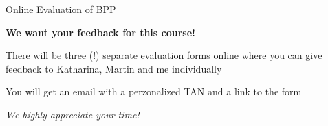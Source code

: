\begin{frame}{Online Evaluation of BPP}

    \begin{alertblock}{}
        {\bf We want your feedback for this course!}
    \end{alertblock}

    \vspace{1em}

    There will be three (!) separate evaluation forms online where you can give feedback to Katharina, Martin and me individually

    \vspace{1em}

    You will get an email with a perzonalized TAN and a link to the form

    \vspace{1em}

    \begin{center}
        {\it We highly appreciate your time!}
    \end{center}

\end{frame}



